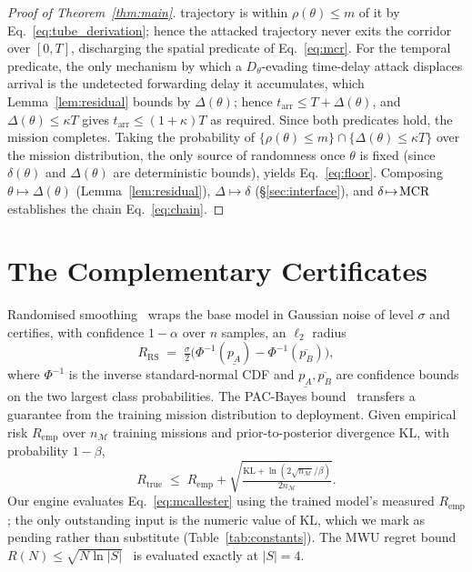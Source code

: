 \begin{proof}[Proof of Theorem~\ref{thm:main}]
trajectory is within $\rho(\theta)\le m$ of it by
Eq.~\eqref{eq:tube_derivation}; hence the attacked trajectory never exits the
corridor over $[0,T]$, discharging the spatial predicate of
Eq.~\eqref{eq:mcr}. For the temporal predicate, the only mechanism by
which a $D_\theta$-evading time-delay attack displaces arrival is the undetected
forwarding delay it accumulates, which Lemma~\ref{lem:residual} bounds by
$\Delta(\theta)$; hence $t_{\mathrm{arr}}\le T+\Delta(\theta)$, and
$\Delta(\theta)\le\kappa T$ gives $t_{\mathrm{arr}}\le(1+\kappa)T$ as required.
Since both predicates hold, the mission completes. Taking the probability of
$\{\rho(\theta)\le m\}\cap\{\Delta(\theta)\le\kappa T\}$ over the mission
distribution, the only source of randomness once $\theta$ is fixed (since
$\delta(\theta)$ and $\Delta(\theta)$ are deterministic bounds), yields
Eq.~\eqref{eq:floor}. Composing
$\theta\!\mapsto\!\Delta(\theta)$ (Lemma~\ref{lem:residual}),
$\Delta\!\mapsto\!\delta$ (\S\ref{sec:interface}), and $\delta\!\mapsto\!\mathrm{MCR}$
establishes the chain Eq.~\eqref{eq:chain}.
\end{proof}


\section{The Complementary Certificates}
\label{app:certs}
Randomised smoothing~\cite{cohen2019smoothing} wraps the base model in
Gaussian noise of level $\sigma$ and certifies, with confidence $1-\alpha$ over
$n$ samples, an $\ell_2$ radius
\begin{equation}
\label{eq:cohen}
R_{\mathrm{RS}} \;=\; \tfrac{\sigma}{2}\big(\Phi^{-1}(\underline{p_A})-\Phi^{-1}(\overline{p_B})\big),
\end{equation}
where $\Phi^{-1}$ is the inverse standard-normal CDF and
$\underline{p_A},\overline{p_B}$ are confidence bounds on the two largest class
probabilities. The PAC-Bayes
bound~\cite{mcallester1999pac,viallard2021pacbayes} transfers a guarantee from
the training mission distribution to deployment. Given empirical risk
$R_{\mathrm{emp}}$ over $n_{\mathcal{M}}$ training missions and
prior-to-posterior divergence $\mathrm{KL}$, with probability $1-\beta$,
\begin{equation}
\label{eq:mcallester}
R_{\mathrm{true}} \;\le\; R_{\mathrm{emp}} + \sqrt{\tfrac{\mathrm{KL}+\ln(2\sqrt{n_{\mathcal{M}}}/\beta)}{2n_{\mathcal{M}}}}.
\end{equation}
Our engine evaluates Eq.~\eqref{eq:mcallester} using the trained model's
measured $R_{\mathrm{emp}}$; the only outstanding input is the numeric value of
$\mathrm{KL}$, which we mark as pending rather than substitute
(Table~\ref{tab:constants}). The MWU regret bound
$R(N)\le\sqrt{N\ln|S|}$~\cite{arora2012mwu,balcan2015commitment} is evaluated
exactly at $|S|=4$.




